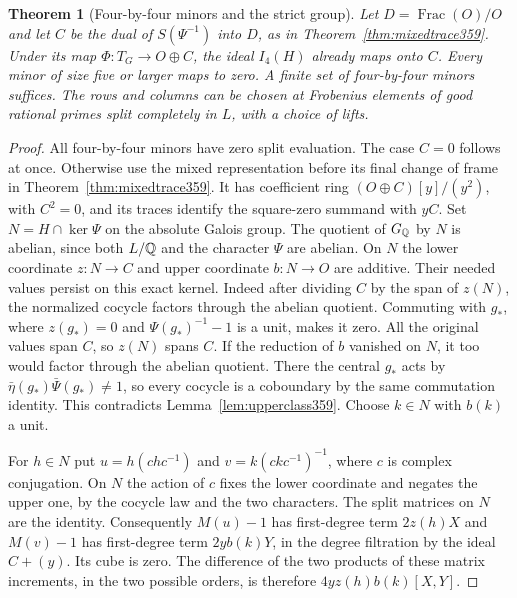 \documentclass[a4paper,11pt]{article}
\newtheorem{theorem}[proposition]{Theorem}
\theoremstyle{definition}
\theoremstyle{remark}
\numberwithin{equation}{section}
\begin{document}
\begin{theorem}[Four-by-four minors and the strict group]
\label{thm:minorstrict373}
Let \(D=\operatorname{Frac}(O)/O\) and let \(C\) be the dual of
\(S(\Psi^{-1})\) into \(D\), as in Theorem~\ref{thm:mixedtrace359}. Under
its map \(\Phi:T_G\to O\oplus C\), the ideal \(I_4(H)\) already
maps onto \(C\). Every minor of size five or larger maps to
zero. A finite set of four-by-four minors suffices. The rows
and columns can be chosen at Frobenius elements of good rational
primes split completely in \(L\), with a choice of lifts.
\end{theorem}
\begin{proof}
All four-by-four minors have zero split evaluation. The case
\(C=0\) follows at once. Otherwise use the mixed representation
before its final change of frame in
Theorem~\ref{thm:mixedtrace359}. It has coefficient ring
\((O\oplus C)[y]/(y^2)\), with \(C^2=0\), and its traces
identify the square-zero summand with \(yC\).
Set \(N=H\cap\ker\Psi\) on the absolute Galois group.
The quotient of \(G_{\mathbb Q}\) by \(N\) is abelian, since both
\(L/\mathbb Q\) and the character \(\Psi\) are abelian. On \(N\)
the lower coordinate \(z:N\to C\) and upper coordinate
\(b:N\to O\) are additive. Their needed values persist on
this exact kernel. Indeed after dividing \(C\) by the span
of \(z(N)\), the normalized cocycle factors through the
abelian quotient. Commuting with \(g_*\), where \(z(g_*)=0\)
and \(\Psi(g_*)^{-1}-1\) is a unit, makes it zero.
All the original values span \(C\), so \(z(N)\) spans \(C\).
If the reduction of \(b\) vanished on \(N\), it too would
factor through the abelian quotient. There the central
\(g_*\) acts by \(\bar\eta(g_*)\bar\Psi(g_*)\ne1\), so
every cocycle is a coboundary by the same commutation identity.
This contradicts Lemma~\ref{lem:upperclass359}. Choose
\(k\in N\) with \(b(k)\) a unit.

For \(h\in N\) put \(u=h(chc^{-1})\) and
\(v=k(ckc^{-1})^{-1}\), where \(c\) is complex conjugation.
On \(N\) the action of \(c\) fixes the lower coordinate and
negates the upper one, by the cocycle law and the two
characters. The split matrices on \(N\) are the identity.
Consequently \(M(u)-1\) has first-degree term \(2z(h)X\)
and \(M(v)-1\) has first-degree term \(2yb(k)Y\), in the
degree filtration by the ideal \(C+(y)\).
Its cube is zero. The difference of the two products of
these matrix increments, in the two possible orders, is
therefore \(4yz(h)b(k)[X,Y]\).


\end{proof}
\end{document}
